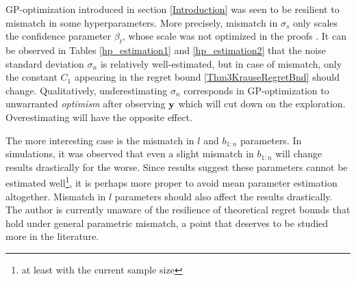 GP-optimization introduced in section \ref{Introduction} was seen to be resilient to mismatch in some hyperparameters. More precisely, mismatch in $\sigma_s$ only scales the confidence parameter $\beta_t$, whose scale was not optimized in the proofs \cite{Krause1}. It can be observed in Tables \ref{hp_estimation1} and \ref{hp_estimation2} that the noise standard deviation $\sigma_n$ is relatively well-estimated, but in case of mismatch, only the constant $C_1$ appearing in the regret bound \ref{Thm3KrauseRegretBnd} should change. Qualitatively, underestimating $\sigma_n$ corresponds in GP-optimization to unwarranted \emph{optimism} after observing $\mathbf{y}$ which will cut down on the exploration. Overestimating will have the opposite effect.

The more interesting case is the mismatch in $l$ and $b_{1:n}$ parameters. In simulations, it was observed that even a slight mismatch in $b_{1:n}$ will change results drastically for the worse. Since results suggest these parameters cannot be estimated well\footnote{at least with the current sample size}, it is perhaps more proper to avoid mean parameter estimation altogether. Mismatch in $l$ parameters should also affect the results drastically. The author is currently unaware of the resilience of theoretical regret bounds that hold under general parametric mismatch, a point that deserves to be studied more in the literature.